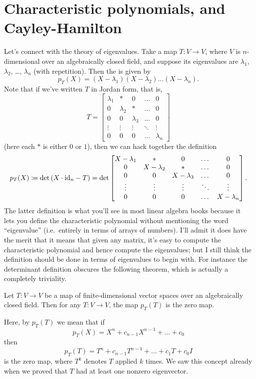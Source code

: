 \section{Characteristic polynomials, and Cayley-Hamilton}
Let's connect with the theory of eigenvalues.
Take a map $T \colon V \to V$, where $V$ is $n$-dimensional
over an algebraically closed field,
and suppose its eigenvalues
are $\lambda_1$, $\lambda_2$, \dots, $\lambda_n$ (with repetition).
Then the  is given by
\[
	p_T(X) = (X-\lambda_1)(X-\lambda_2) \dots (X-\lambda_n).
\]
Note that if we've written $T$ in Jordan form, that is,
\[
	T = \begin{bmatrix}
		\lambda_1 & \ast & 0 & \dots & 0 \\
		0 & \lambda_2 & \ast & \dots & 0 \\
		0 & 0 & \lambda_3 & \dots & 0 \\
		\vdots & \vdots & \vdots & \ddots & \vdots \\
		0 & 0 & 0 & \dots & \lambda_n
	\end{bmatrix}
\]
(here each $\ast$ is either $0$ or $1$),
then we can hack together the definition
\[
	p_T(X) \coloneqq
	\det \left( X \cdot \mathrm{id}_n - T \right)
	= \det \begin{bmatrix}
		X - \lambda_1 & \ast & 0 & \dots & 0 \\
		0 & X - \lambda_2 & \ast & \dots & 0 \\
		0 & 0 & X - \lambda_3 & \dots & 0 \\
		\vdots & \vdots & \vdots & \ddots & \vdots \\
		0 & 0 & 0 & \dots & X - \lambda_n
	\end{bmatrix}.
\]
The latter definition is what you'll see in most
linear algebra books because it lets you define the characteristic polynomial
without mentioning the word ``eigenvalue''
(i.e.\ entirely in terms of arrays of numbers).
I'll admit it does have the merit that it means that given any matrix,
it's easy to compute the characteristic polynomial and hence
compute the eigenvalues;
but I still think the definition should be done in terms of
eigenvalues to begin with.
For instance the determinant definition obscures the following theorem,
which is actually a completely triviality.
\begin{theorem}
	Let $T \colon V \to V$ be a map of finite-dimensional
	vector spaces over an algebraically closed field.
	Then for any $T \colon V \to V$,
	the map $p_T(T)$ is the zero map.
\end{theorem}
Here, by $p_T(T)$ we mean that if
\[ p_T(X) = X^n + c_{n-1} X^{n-1} + \dots + c_0 \]
then \[ p_T(T) = T^n + c_{n-1} T^{n-1} + \dots + c_1 T +  c_0 I \]
is the zero map,
where $T^k$ denotes $T$ applied $k$ times.
We saw this concept already when we proved
that $T$ had at least one nonzero eigenvector.

